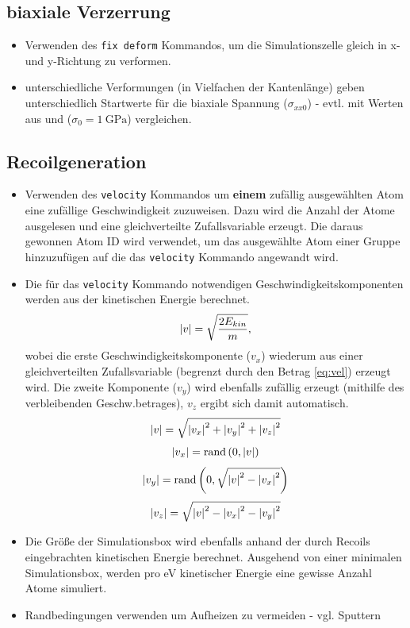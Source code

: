 \documentclass[a4paper, 10pt, 
               numbers=noenddot, toc=graduated,
               headsepline=true, footsepline=true,
               twoside=false, titlepage=true, 
               bibliography=totoc]{scrartcl}
\begin{document}
\subsection{biaxiale Verzerrung}
	\begin{itemize}
		\item Verwenden des \texttt{fix deform} Kommandos, um die Simulationszelle gleich in x- und y-Richtung zu verformen.
		\item unterschiedliche Verformungen (in Vielfachen der Kantenlänge) geben unterschiedlich Startwerte für die biaxiale Spannung ($\sigma_{xx0}$) - evtl. mit Werten aus \cite{Mayr2005} und \cite{Mayr2003} ($\sigma_0 = \SI{1}{\giga\pascal}$) vergleichen.
	\end{itemize}

\subsection{Recoilgeneration}
	\begin{itemize}
		\item Verwenden des \texttt{velocity} Kommandos um \textbf{einem} zufällig ausgewählten Atom eine zufällige Geschwindigkeit zuzuweisen. Dazu wird die Anzahl der Atome ausgelesen und eine gleichverteilte Zufallsvariable erzeugt. Die daraus gewonnen Atom ID wird verwendet, 
		um das ausgewählte Atom einer Gruppe hinzuzufügen auf die das \texttt{velocity} Kommando angewandt wird.
		\item Die für das \texttt{velocity} Kommando notwendigen Geschwindigkeitskomponenten werden aus der kinetischen Energie berechnet.
		\begin{equation}
			\abs{v} = \sqrt{\frac{2E_{kin}}{m}},
			\label{eq:vel}
		\end{equation}
		wobei die erste Geschwindigkeitskomponente ($v_x$) wiederum aus einer gleichverteilten Zufallsvariable (begrenzt durch den Betrag \ref{eq:vel}) erzeugt wird. Die zweite Komponente ($v_y$) wird ebenfalls zufällig erzeugt (mithilfe des verbleibenden Geschw.betrages), 
		$v_z$ ergibt sich damit automatisch.
		\begin{equation}
			\abs{v} = \sqrt{\abs{v_x}^2+\abs{v_y}^2+\abs{v_z}^2}
		\end{equation}
		\begin{equation}
			\abs{v_x} = \mathrm{rand}\left(0,\abs{v}\right) 
		\end{equation}
		\begin{equation}
			\abs{v_y} = \mathrm{rand}\left(0,\sqrt{\abs{v}^2-\abs{v_x}^2}\right)
		\end{equation}
		\begin{equation}
			\abs{v_z} = \sqrt{\abs{v}^2-\abs{v_x}^2-\abs{v_y}^2}
		\end{equation}
		\item Die Größe der Simulationsbox wird ebenfalls anhand der durch Recoils eingebrachten kinetischen Energie berechnet. Ausgehend von einer minimalen Simulationsbox, werden pro eV kinetischer Energie eine gewisse Anzahl Atome simuliert.
		\item Randbedingungen verwenden um Aufheizen zu vermeiden - vgl. Sputtern
	\end{itemize}



\end{document}
